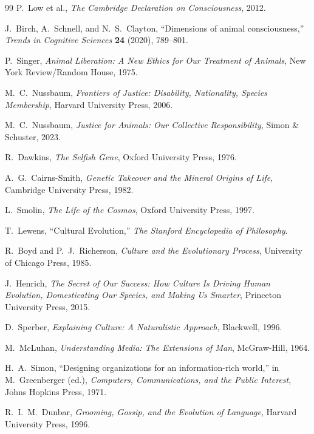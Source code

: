 \documentclass[11pt]{article}
\theoremstyle{remark}
\theoremstyle{plain}
\begin{document}
\begin{thebibliography}{99}
P.\ Low et al.,
\emph{The Cambridge Declaration on Consciousness},
2012.

J.\ Birch, A.\ Schnell, and N.\ S.\ Clayton,
``Dimensions of animal consciousness,''
\emph{Trends in Cognitive Sciences} \textbf{24} (2020), 789--801.

P.\ Singer,
\emph{Animal Liberation: A New Ethics for Our Treatment of Animals},
New York Review/Random House, 1975.

M.\ C.\ Nussbaum,
\emph{Frontiers of Justice: Disability, Nationality, Species Membership},
Harvard University Press, 2006.

M.\ C.\ Nussbaum,
\emph{Justice for Animals: Our Collective Responsibility},
Simon \& Schuster, 2023.

R.\ Dawkins,
\emph{The Selfish Gene},
Oxford University Press, 1976.

A.\ G.\ Cairns-Smith,
\emph{Genetic Takeover and the Mineral Origins of Life},
Cambridge University Press, 1982.

L.\ Smolin,
\emph{The Life of the Cosmos},
Oxford University Press, 1997.

T.\ Lewens,
``Cultural Evolution,''
\emph{The Stanford Encyclopedia of Philosophy}.

R.\ Boyd and P.\ J.\ Richerson,
\emph{Culture and the Evolutionary Process},
University of Chicago Press, 1985.

J.\ Henrich,
\emph{The Secret of Our Success: How Culture Is Driving Human Evolution, Domesticating Our Species, and Making Us Smarter},
Princeton University Press, 2015.

D.\ Sperber,
\emph{Explaining Culture: A Naturalistic Approach},
Blackwell, 1996.

M.\ McLuhan,
\emph{Understanding Media: The Extensions of Man},
McGraw-Hill, 1964.

H.\ A.\ Simon,
``Designing organizations for an information-rich world,''
in M.\ Greenberger (ed.),
\emph{Computers, Communications, and the Public Interest},
Johns Hopkins Press, 1971.

R.\ I.\ M.\ Dunbar,
\emph{Grooming, Gossip, and the Evolution of Language},
Harvard University Press, 1996.


\end{thebibliography}
\end{document}
